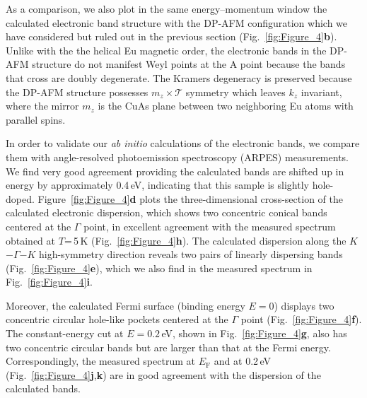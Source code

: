 \documentclass[aps,prl,amsmath,amssymb,amstext,citeautoscript,punctuation,nofootinbib,superscriptaddress,twocolumn]{revtex4-1}
\begin{document}
As a comparison, we also plot in the same energy--momentum window the calculated electronic band structure with the DP-AFM configuration which we have considered but ruled out in the previous section (Fig.~\ref{fig:Figure_4}\textbf{b}). Unlike with the the helical Eu magnetic order, the electronic bands in the DP-AFM structure do not manifest Weyl points at the A point because the bands that cross are doubly degenerate. %
The Kramers degeneracy is preserved because the DP-AFM structure possesses $m_z \times \mathcal{T}$ symmetry which leaves $k_z$ invariant, where the mirror $m_z$ is the CuAs plane between two neighboring Eu atoms with parallel spins. 
	
In order to validate our \textit{ab initio} calculations of the electronic bands, we compare them with angle-resolved photoemission spectroscopy (ARPES) measurements. We find very good agreement providing the calculated bands are shifted up in energy by approximately 0.4\,eV, indicating that this sample is slightly hole-doped. Figure~\ref{fig:Figure_4}\textbf{d} plots the three-dimensional cross-section of the calculated electronic dispersion, which shows two concentric conical bands centered at the $\Gamma$ point, in excellent agreement with the measured spectrum obtained at $T$=\,5\,K (Fig.~\ref{fig:Figure_4}\textbf{h}). The calculated dispersion along the $K$$-$$\Gamma$$-$$K$ high-symmetry direction reveals two pairs of linearly dispersing bands (Fig.~\ref{fig:Figure_4}\textbf{e}), which we also find in the measured spectrum in Fig.~\ref{fig:Figure_4}\textbf{i}.

Moreover, the calculated Fermi surface (binding energy $E = 0$) displays two concentric circular hole-like pockets centered at the $\Gamma$ point (Fig.~\ref{fig:Figure_4}\textbf{f}). The constant-energy cut at $E =0.2$\,eV, shown in Fig.~\ref{fig:Figure_4}\textbf{g}, also has two concentric circular bands but are larger than that at the Fermi energy. Correspondingly, the measured spectrum at $E_\mathrm{F}$ and at 0.2\,eV (Fig.~\ref{fig:Figure_4}\textbf{j},\textbf{k}) are in good agreement with the dispersion of the calculated bands.
	
\end{document}
